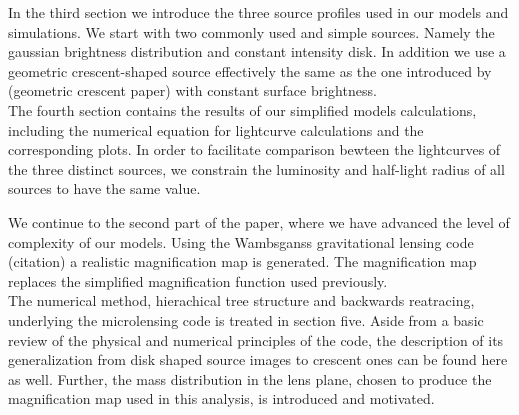 In the third section we introduce the three source profiles used in our models and simulations. We start with two commonly used and simple sources. Namely the gaussian brightness distribution and constant intensity disk. In addition we use a geometric crescent-shaped source effectively the same as the one introduced by (geometric crescent paper) with constant surface brightness. \\
The fourth section contains the results of our simplified models calculations, including the numerical equation for lightcurve calculations and the corresponding plots. In order to facilitate comparison bewteen the lightcurves of the three distinct sources, we constrain the luminosity and half-light radius of all sources to have the same value.    
       
We continue to the second part of the paper, where we have advanced the level of complexity of our models. Using the Wambsganss gravitational lensing code (citation) a realistic magnification map is generated. The magnification map replaces the simplified magnification function used previously.  \\
The numerical method, hierachical tree structure and backwards reatracing, underlying the microlensing code is treated in section five. Aside from a basic review of the physical and numerical principles of the code, the description of its generalization from disk shaped source images to crescent ones can be found here as well. Further, the mass distribution in the lens plane, chosen to produce the magnification map used in this analysis, is introduced and motivated.   
